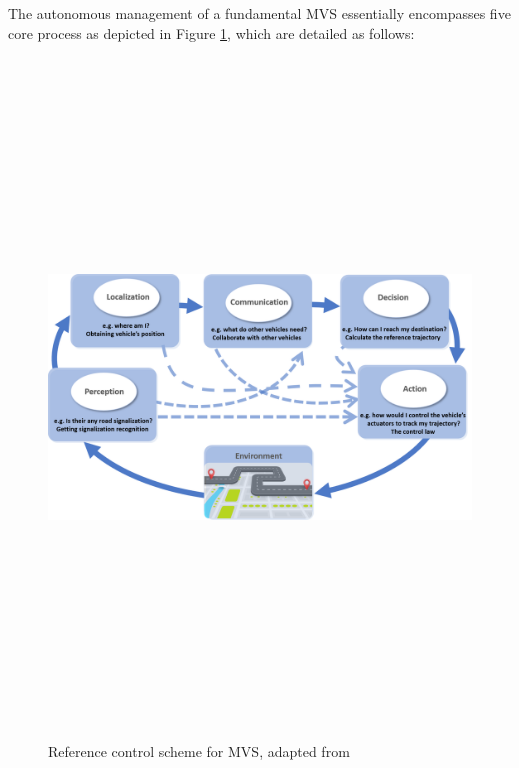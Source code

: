 The autonomous management of a fundamental MVS essentially encompasses five core process as depicted in Figure \ref{fig:MVS_architecture_concept}, which are detailed as follows: 

\begin{figure}[!h]
        \centering 
        \includegraphics[width=12cm,height=18cm,keepaspectratio]{chapters/Chapitre_3/Figures/Diagram_MVS_architecture.png}
        \caption{Reference control scheme for MVS, adapted from \cite{ventura2015safe}}
        \label{fig:MVS_architecture_concept}
        \end{figure}

